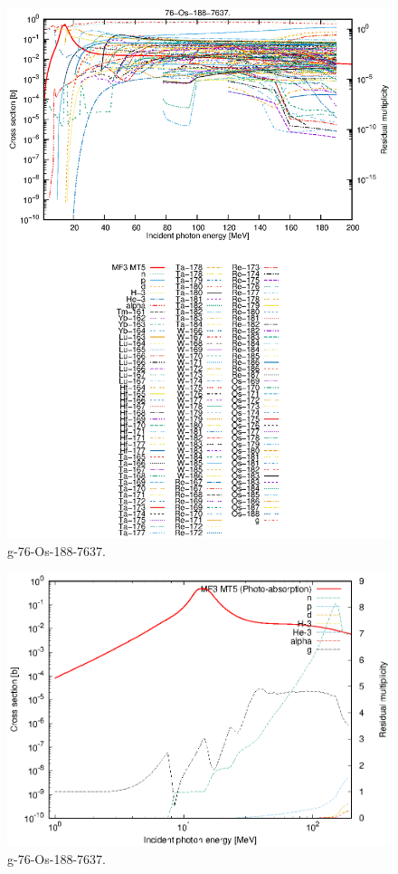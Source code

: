 \begin{figure}
 \includegraphics[width=\linewidth]{eps/g_76-Os-188_7637.eps}
  \caption{g-76-Os-188-7637.}
\end{figure}
\newpage \clearpage

\begin{figure}
 \includegraphics[width=\linewidth]{eps-log/g_76-Os-188_7637.eps}
 \caption{g-76-Os-188-7637.}
\end{figure}
\newpage \clearpage

